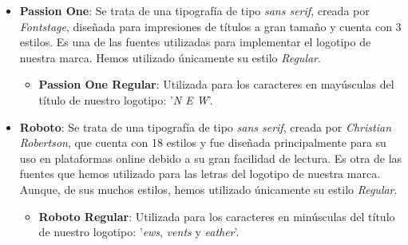 \documentclass[../ei103948-project-documentation.tex]{subfiles}
\begin{document}
                                \begin{itemize}
                                    \item \textbf{Passion One}: Se trata de una tipografía de tipo \textit{sans serif}, creada por \textit{Fontstage}, diseñada para impresiones de títulos a gran tamaño y cuenta con 3 estilos. Es una de las fuentes utilizadas para implementar el logotipo de nuestra marca. Hemos utilizado únicamente su estilo \textit{Regular}.
                                        \begin{itemize}
                                            \item \textbf{Passion One Regular}: Utilizada para los caracteres en mayúsculas del título de nuestro logotipo: '\textit{N E W}'.
                                            \begin{figure}[H]
                                                \begin{center}
                                                \end{center}
                                            \end{figure}
                                        \end{itemize}
                                    \item \textbf{Roboto}: Se trata de una tipografía de tipo \textit{sans serif}, creada por \textit{Christian Robertson}, que cuenta con 18 estilos y fue diseñada principalmente para su uso en plataformas online debido a su gran facilidad de lectura. Es otra de las fuentes que hemos utilizado para las letras del logotipo de nuestra marca. Aunque, de sus muchos estilos, hemos utilizado únicamente su estilo \textit{Regular}.
                                        \begin{itemize}
                                            \item \textbf{Roboto Regular}: Utilizada para los caracteres en minúsculas del título de nuestro logotipo: '\textit{ews}, \textit{vents} y \textit{eather}'.
                                            \begin{figure}[H]

\end{figure}
\end{itemize}
\end{itemize}
\end{document}
